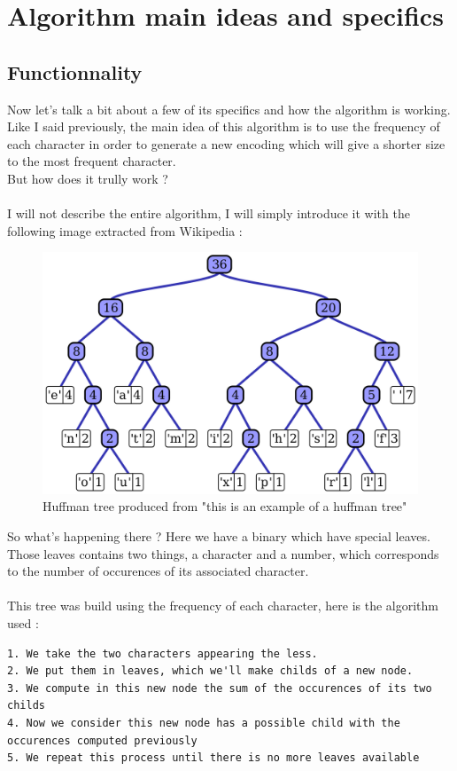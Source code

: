 \section{Algorithm main ideas and specifics}

\subsection{Functionnality}
Now let's talk a bit about a few of its specifics and how the algorithm is working.\\
Like I said previously, the main idea of this algorithm is to use the frequency of each character in order to generate a new encoding which will give a shorter size to the most frequent character.\\
But how does it trully work ?\\
\\
I will not describe the entire algorithm, I will simply introduce it with the following image extracted from Wikipedia :
\begin{figure}[H]
    \centering
    \includegraphics[scale=0.16]{img/huffmanTree.png}
    \caption{Huffman tree produced from "this is an example of a huffman tree"}
    \label{fig:my_label}
\end{figure}
So what's happening there ? Here we have a binary which have special leaves.\\
Those leaves contains two things, a character and a number, which corresponds to the number of occurences of its associated character.\\
\\
This tree was build using the frequency of each character, here is the algorithm used :
\begin{verbatim}
1. We take the two characters appearing the less.
2. We put them in leaves, which we'll make childs of a new node.
3. We compute in this new node the sum of the occurences of its two childs
4. Now we consider this new node has a possible child with the occurences computed previously
5. We repeat this process until there is no more leaves available
\end{verbatim}

